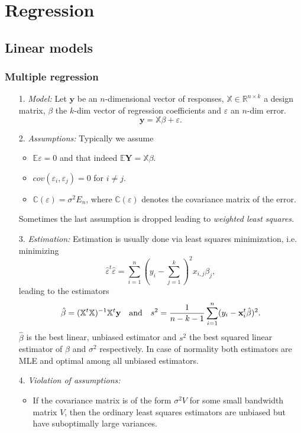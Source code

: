 \documentclass[12pt,a4paper]{amsart}
\theoremstyle{definition}
\theoremstyle{remark}
\numberwithin{equation}{section}
\begin{document}
\section{Regression}

\subsection{Linear models}

\subsubsection{Multiple regression}

\begin{itemize}
\item[1.] \textit{Model:} Let $\mathbf{y}$ be an $n$-dimensional vector of responses, $ \mathbb{X}\in \mathbb{R}^{n \times k}$ a design matrix, $\beta$ the $k$-dim vector of regression coefficients and $\varepsilon$ an $n$-dim error. 
$$\mathbf{y}=\mathbb{X}\beta+\varepsilon.$$
\item[2.] \textit{Assumptions:} Typically we assume 
\begin{itemize}
\item $\mathbb{E}\varepsilon=0$ and that indeed $\mathbb{E}\mathbf{Y}= \mathbb{X}\beta$.
\item $cov(\varepsilon_i, \varepsilon_j)=0$ for $i \neq j$. 
\item $\mathbb{C}(\varepsilon)=\sigma^2 E_n$, where $\mathbb{C}(\varepsilon)$ denotes the covariance matrix of the error.
\end{itemize}
Sometimes the last assumption is dropped leading to \textit{weighted least squares.}
\item[3.] \textit{Estimation:} Estimation is usually done via least squares minimization, i.e. minimizing
$$\hat{\varepsilon}^t\hat{\varepsilon}=\sum_{i=1}^n (y_i-\sum_{j=1}^k)^2 x_{i,j} \beta_j,$$
leading to the estimators 
$$\hat{\beta}=(\mathbb{X}^t\mathbb{X})^{-1}\mathbb{X}^t \mathbf{y} \quad \textnormal{and} \quad s^2= \frac{1}{n-k-1} \sum_{i=1}^n (y_i-\mathbf{x}_i^t \hat{\beta})^2.$$
$\hat{\beta}$ is the best linear, unbiased estimator and $s^2$ the best squared linear estimator of $\beta$ and $\sigma^2$ respectively. In case of normality both estimators are MLE and optimal among all unbiased estimators.
\item[4.] \textit{Violation of assumptions:} 
\begin{itemize}
\item If the covariance matrix is of the form $\sigma^2 V$ for some small bandwidth matrix $V$, then the ordinary least squares estimators are unbiased but have suboptimally large variances.

\end{itemize}
\end{itemize}
\end{document}
